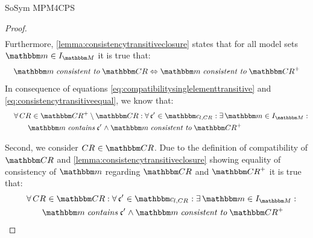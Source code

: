 \begin{copiedFrom}{SoSym MPM4CPS}
\begin{proof}
\begin{align}
    \end{align}  
    Furthermore, \autoref{lemma:consistencytransitiveclosure} states that for all model sets $\modelset{m} \in \metamodelinstances{\metamodelset{M}}$ it is true that:
    \begin{align}
        \formulaskip & \label{eq:consistencytransitiveequal}
        \modelset{m} \consistenttomath \consistencyrelationset{CR} \equivalent \modelset{m} \consistenttomath \transitiveclosure{\consistencyrelationset{CR}}
    \end{align}
    In consequence of equations \ref{eq:compatibilitysinglelementtransitive} and \ref{eq:consistencytransitiveequal}, we know that:
    \begin{align}
        \formulaskip & \nonumber \label{eq:compatibilityonlyclosure}
        \forall \consistencyrelation{CR}{} \in \transitiveclosure{\consistencyrelationset{CR}} \setminus \consistencyrelationset{CR} : \forall \conditionelement{c'}{} \in \condition{c}{l, \consistencyrelation{CR}{}} %
        : \exists \modelset{m} \in \metamodelinstances{\metamodelset{M}} : \\
        & \formulaskip \formulaskip
        \modelset{m} \mathtext{contains} \conditionelement{c'}{} \land \modelset{m} \mathtext{consistent to} \transitiveclosure{\consistencyrelationset{CR}}
    \end{align}
    
    Second, we consider $\consistencyrelation{CR}{} \in \consistencyrelationset{CR}$.
    Due to the definition of compatibility of $\consistencyrelationset{CR}$ and \autoref{lemma:consistencytransitiveclosure} showing equality of consistency of $\modelset{m}$ regarding $\consistencyrelationset{CR}$ and $\transitiveclosure{\consistencyrelationset{CR}}$ it is true that:
    \begin{align}
        \formulaskip & \nonumber \label{eq:compatibilitynonclosure}
        \forall \consistencyrelation{CR}{} \in \consistencyrelationset{CR} : \forall \conditionelement{c'}{} \in \condition{c}{l, \consistencyrelation{CR}{}} %
        : \exists \modelset{m} \in \metamodelinstances{\metamodelset{M}} : \\
        & \formulaskip \formulaskip
        \modelset{m} \mathtext{contains} \conditionelement{c'}{} \land \modelset{m} \mathtext{consistent to} \transitiveclosure{\consistencyrelationset{CR}}
    \end{align}
    

\end{proof}
\end{copiedFrom}
